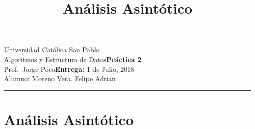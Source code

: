 \documentclass{article}
\title{Análisis Asintótico}
\date{}
\newcommand{\assignment}{Práctica 2}
\newcommand{\duedate}{1 de Julio, 2018}
\begin{document}
Universidad Católica San Pablo\hfill\\
Algoritmos y Estructura de Datos\hfill\textbf{\assignment}\\
Prof.\ Jorge Poco\hfill\textbf{Entrega:} \duedate\\
Alumno: Moreno Vera, Felipe Adrian
\smallskip\hrule\bigskip

{\let\newpage\relax\maketitle}
\section{Análisis Asintótico}
\end{document}
